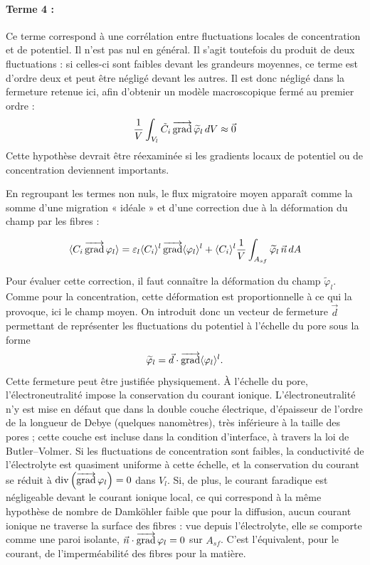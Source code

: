 \paragraph{Terme 4 :}
Ce terme correspond à une corrélation entre fluctuations locales de
concentration et de potentiel. Il n'est pas nul en général. Il s'agit
toutefois du produit de deux fluctuations : si celles-ci sont faibles devant
les grandeurs moyennes, ce terme est d'ordre deux et peut être négligé devant
les autres. Il est donc négligé dans la fermeture retenue ici, afin d'obtenir
un modèle macroscopique fermé au premier ordre :
\begin{equation}
\frac{1}{V}\int_{V_l} \tilde{C}_i \mathop{\overrightarrow{\operatorname{grad}}}\nolimits\widetilde{\varphi}_l\, dV \approx \vec{0}
\end{equation}
Cette hypothèse devrait être réexaminée si les gradients locaux de potentiel
ou de concentration deviennent importants.

En regroupant les termes non nuls, le flux migratoire moyen apparaît comme la
somme d'une migration « idéale » et d'une correction due à la déformation du
champ par les fibres :

\begin{equation}
\langle C_i \mathop{\overrightarrow{\operatorname{grad}}}\nolimits\varphi_l \rangle
= \varepsilon_l \langle C_i \rangle^l \mathop{\overrightarrow{\operatorname{grad}}}\nolimits\langle \varphi_l \rangle^l
+ \langle C_i \rangle^l \frac{1}{V}\int_{A_{sf}} \widetilde{\varphi}_l\,\vec{n}\, dA
\end{equation}

Pour évaluer cette correction, il faut connaître la déformation du champ
$\tilde{\varphi}_l$. Comme pour la concentration, cette déformation est
proportionnelle à ce qui la provoque, ici le champ moyen. On introduit donc un
vecteur de fermeture $\vec{d}$ permettant de représenter les fluctuations du
potentiel à l'échelle du pore sous la forme
\[
\widetilde{\varphi}_l
=
\vec{d}\cdot\mathop{\overrightarrow{\operatorname{grad}}}\nolimits\langle\varphi_l\rangle^l.
\]
Cette fermeture peut être justifiée physiquement. À l'échelle du pore,
l'électroneutralité impose la conservation du courant ionique.
L'électroneutralité n'y est mise en défaut que dans la double couche
électrique, d'épaisseur de l'ordre de la longueur de Debye (quelques
nanomètres), très inférieure à la taille des pores ; cette couche est
incluse dans la condition d'interface, à travers la loi de
Butler--Volmer. Si les fluctuations de concentration sont faibles, la
conductivité de l'électrolyte est quasiment uniforme à cette échelle, et
la conservation du courant se réduit à
$\operatorname{div}\left(\mathop{\overrightarrow{\operatorname{grad}}}\nolimits\varphi_l\right) = 0$ dans $V_l$. Si, de plus, le courant
faradique est négligeable devant le courant ionique local, ce qui
correspond à la même hypothèse de nombre de Damköhler faible que pour la
diffusion, aucun courant ionique ne traverse la surface des fibres : vue
depuis l'électrolyte, elle se comporte comme une paroi isolante,
$\vec{n}\cdot\mathop{\overrightarrow{\operatorname{grad}}}\nolimits\varphi_l = 0$ sur $A_{sf}$. C'est l'équivalent, pour le
courant, de l'imperméabilité des fibres pour la matière.

